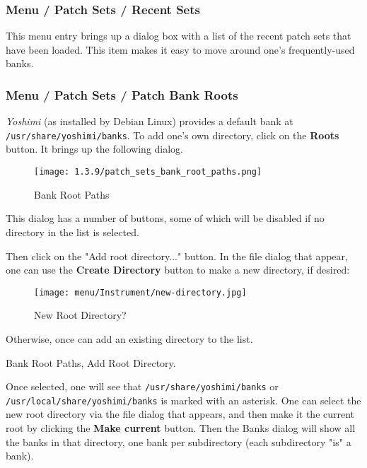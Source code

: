 \subsubsection{Menu / Patch Sets / Recent Sets}
\label{subsubsec:menu_patch_sets_recent_sets}

   This menu entry brings up a dialog box with a list of the recent patch sets
   that have been loaded.  This item makes it easy to move around one's
   frequently-used banks.

\subsubsection{Menu / Patch Sets / Patch Bank Roots}
\label{subsubsec:menu_patch_sets_patch_bank_roots}

   \textsl{Yoshimi} (as installed by Debian Linux) provides a default bank at
   \texttt{/usr/share/yoshimi/banks}.
   To add one's own directory, click on the \textbf{Roots} button.
   It brings up the following dialog.

\begin{figure}[H]
   \centering
   \texttt{[image: 1.3.9/patch\_sets\_bank\_root\_paths.png]}
   \caption{Bank Root Paths}
   \label{fig:bank_root_paths}
\end{figure}

   This dialog has a number of buttons, some of which will be disabled if no
   directory in the list is selected.

   Then click on the "Add root directory..." button.  In the file dialog that
   appear, one can use the \textbf{Create Directory} button to make a new
   directory, if desired:

\begin{figure}[H]
   \centering
   \texttt{[image: menu/Instrument/new-directory.jpg]}
   \caption{New Root Directory?}
   \label{fig:new_root_directory}
\end{figure}

   Otherwise, once can add an existing directory to the list.

   \setcounter{ItemCounter}{0}      %

   Bank Root Paths, Add Root Directory.

   Once selected, one will see that
   \texttt{/usr/share/yoshimi/banks} or
   \texttt{/usr/local/share/yoshimi/banks}
   is marked with an asterisk.  One can select the new root directory via the
   file dialog that appears, and then make it the current root by clicking the
   \textbf{Make current} button.  Then the Banks dialog will show all the banks
   in that directory, one bank per subdirectory (each subdirectory "is" a
   bank).

